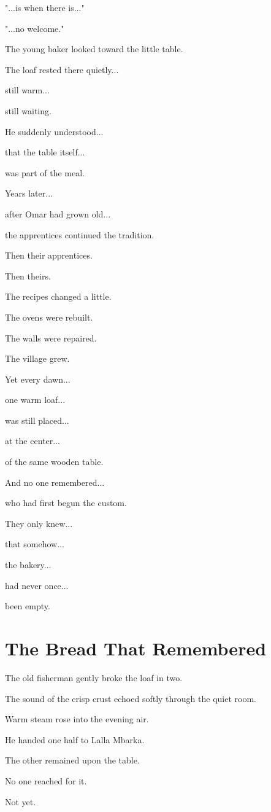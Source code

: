 \documentclass[12pt,openany]{book}
\begin{document}
"...is when there is..."

"...no welcome."

The young baker looked toward the little table.

The loaf rested there quietly...

still warm...

still waiting.

He suddenly understood...

that the table itself...

was part of the meal.

Years later...

after Omar had grown old...

the apprentices continued the tradition.

Then their apprentices.

Then theirs.

The recipes changed a little.

The ovens were rebuilt.

The walls were repaired.

The village grew.

Yet every dawn...

one warm loaf...

was still placed...

at the center...

of the same wooden table.

And no one remembered...

who had first begun the custom.

They only knew...

that somehow...

the bakery...

had never once...

been empty.
\section*{The Bread That Remembered}

The old fisherman gently broke the loaf in two.

The sound of the crisp crust echoed softly through the quiet room.

Warm steam rose into the evening air.

He handed one half to Lalla Mbarka.

The other remained upon the table.

No one reached for it.

Not yet.
\end{document}
